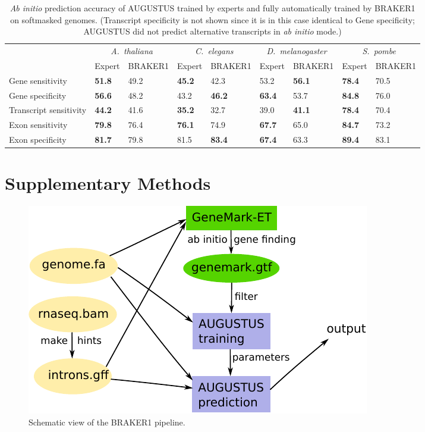 \documentclass[a4paper,10pt]{report}
\begin{document}
\begin{table}[h!]
\caption{\textit{Ab initio} prediction accuracy of AUGUSTUS trained by experts and fully automatically trained by BRAKER1 on softmasked genomes. (Transcript specificity is not shown since it is in this case identical to Gene specificity; AUGUSTUS did not predict alternative transcripts in \textit{ab initio} mode.) \label{single_preds_braker}}
\begin{center}
\begin{tabular}{lp{1.5cm}p{1.2cm}p{1.2cm}p{1.2cm}p{1.2cm}p{1.2cm}p{1.2cm}p{1.2cm}}\hline
 & \multicolumn{2}{c}{\textit{A.~thaliana}} &  \multicolumn{2}{c}{\textit{C.~elegans}} &  \multicolumn{2}{c}{\textit{D.~melanogaster}} &  \multicolumn{2}{c}{\textit{S.~pombe}}\\
 & \tiny{Expert} & \tiny{BRAKER1} & \tiny{Expert} & \tiny{BRAKER1} &  \tiny{Expert} & \tiny{BRAKER1} & \tiny{Expert} &\tiny{BRAKER1}\\
 \hline
Gene sensitivity        & \textbf{51.8} & 49.2 & \textbf{45.2} & 42.3 & 53.2 & \textbf{56.1} & \textbf{78.4} & 70.5 \\
Gene specificity        & \textbf{56.6} & 48.2 & 43.2 & \textbf{46.2} & \textbf{63.4} & 53.7 & \textbf{84.8} & 76.0  \\
Transcript sensitivity  & \textbf{44.2} & 41.6 & \textbf{35.2} & 32.7 & 39.0 & \textbf{41.1} & \textbf{78.4} & 70.4  \\
Exon sensitivity        & \textbf{79.8} & 76.4 & \textbf{76.1} & 74.9 & \textbf{67.7} & 65.0 & \textbf{84.7} & 73.2  \\
Exon specificity        & \textbf{81.7} & 79.8 & 81.5 & \textbf{83.4} & \textbf{67.4} & 63.3 & \textbf{89.4} & 83.1  \\
\hline
\end{tabular}
\end{center}
\end{table}




\chapter{Supplementary Methods}

\begin{figure}[!h]%
\centerline{\includegraphics[width=0.7\linewidth]{figs/Figure1.pdf}}
\caption{Schematic view of the BRAKER1 pipeline.}\label{pipeline}
\end{figure}
\end{document}
